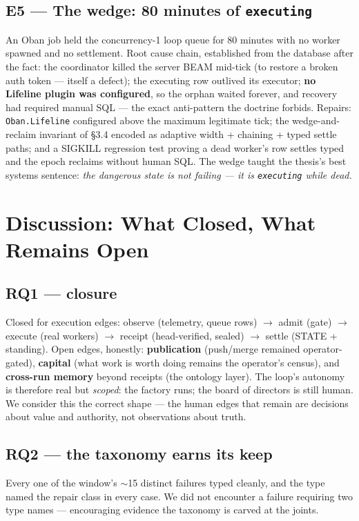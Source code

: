 \documentclass[11pt,a4paper]{article}
\theoremstyle{remark}
\newcommand{\term}[1]{\texttt{#1}}
\begin{document}
\subsection{E5 --- The wedge: 80 minutes of \term{executing}}
An Oban job held the concurrency-1 loop queue for 80 minutes with no worker spawned and no settlement. Root cause chain, established from the database after the fact: the coordinator killed the server BEAM mid-tick (to restore a broken auth token --- itself a defect); the executing row outlived its executor; \textbf{no Lifeline plugin was configured}, so the orphan waited forever, and recovery had required manual SQL --- the exact anti-pattern the doctrine forbids. Repairs: \term{Oban.Lifeline} configured above the maximum legitimate tick; the wedge-and-reclaim invariant of \S3.4 encoded as adaptive width + chaining + typed settle paths; and a SIGKILL regression test proving a dead worker's row settles typed and the epoch reclaims without human SQL. The wedge taught the thesis's best systems sentence: \emph{the dangerous state is not failing --- it is \term{executing} while dead.}

\section{Discussion: What Closed, What Remains Open}

\subsection{RQ1 --- closure}
Closed for execution edges: observe (telemetry, queue rows) $\to$ admit (gate) $\to$ execute (real workers) $\to$ receipt (head-verified, sealed) $\to$ settle (STATE + standing). Open edges, honestly: \textbf{publication} (push/merge remained operator-gated), \textbf{capital} (what work is worth doing remains the operator's census), and \textbf{cross-run memory} beyond receipts (the ontology layer). The loop's autonomy is therefore real but \emph{scoped}: the factory runs; the board of directors is still human. We consider this the correct shape --- the human edges that remain are decisions about value and authority, not observations about truth.

\subsection{RQ2 --- the taxonomy earns its keep}
Every one of the window's $\sim$15 distinct failures typed cleanly, and the type named the repair class in every case. We did not encounter a failure requiring two type names --- encouraging evidence the taxonomy is carved at the joints.
\end{document}
